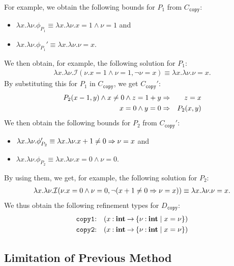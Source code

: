 \vspace{-4pt}
%
For example, we obtain the following bounds for \(P_1\) from 
\(C_{\texttt{copy}}\):
\vspace{-4pt}
\begin{itemize}
\item \(\lambda x.\lambda \nu.\phi_{P_1}\equiv \lambda x.\lambda \nu.x=1 \land \nu=1\) and
\item \(\lambda x.\lambda \nu.\phi_{P_1}'\equiv \lambda x.\lambda \nu.\nu=x\).
\end{itemize}
\vspace{-4pt}
We then obtain, for example, the following solution for \(P_1\):
\begin{eqnarray*}
\lambda x.\lambda \nu.\mathcal{I}(\nu.x=1 \land \nu=1,\neg \nu=x) \equiv \lambda x.\lambda \nu.\nu=x.
\end{eqnarray*}
By substituting this for \(P_1\) in \(C_{\texttt{copy}}\), we get
\(C_{\texttt{copy}}'\):
\begin{eqnarray*}
P_2(x-1,y) \land x\neq0 \land z=1+y &\Rightarrow& z=x \\
x=0 \land y=0 &\Rightarrow& P_2(x,y)
\end{eqnarray*}
We then obtain the following bounds for \(P_2\) from 
\(C_{\texttt{copy}}'\):
\vspace{-4pt}
\begin{itemize}
\item \(\lambda x.\lambda \nu. \phi_{P_2}' \equiv \lambda x.\lambda \nu. x+1\neq0 \Rightarrow \nu=x\) and
\item \(\lambda x.\lambda \nu. \phi_{P_2} \equiv \lambda x.\lambda \nu. x=0 \land \nu=0\).
\end{itemize}
\vspace{-4pt}
By using them, we get, for example, the following solution for \(P_2\):
\begin{eqnarray*}
\lambda x.\lambda \nu.\mathcal{I}(\nu.x=0 \land \nu=0,\neg (x+1\neq0 \Rightarrow \nu=x)) \equiv \lambda x.\lambda \nu.\nu=x.
\end{eqnarray*}
We thus obtain the following refinement types for \(D_{\texttt{copy}}\):
\begin{eqnarray*}
\texttt{copy1}&\mathbin{:}&(x\mathbin{:}{\mathbf{int}}\mathbin{\rightarrow}{\{{\nu\mathbin{:}\mathbf{int} \mid x=\nu}\}}) \\
\texttt{copy2}&\mathbin{:}&(x\mathbin{:}{\mathbf{int}}\mathbin{\rightarrow}{\{{\nu\mathbin{:}\mathbf{int} \mid x=\nu}\}})
\end{eqnarray*}

\vspace{-2pt}
\subsection{Limitation of Previous Method}
\label{sec:limit}


